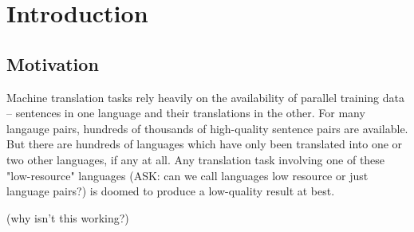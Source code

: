 

\chapter{Introduction}
\label{chap:introduction}

\section{Motivation}

Machine translation tasks rely heavily on the availability of parallel training data -- sentences in one language and their 
translations in the other. For many langauge pairs, hundreds of thousands of high-quality sentence pairs are available. But there 
are hundreds of languages which have only been translated into one or two other languages, if any at all. Any translation task 
involving one of these "low-resource" languages (ASK: can we call languages low resource or just language pairs?) is doomed to 
produce a low-quality result at best. 

\cite{vaswani2017attention} (why isn't this working?)